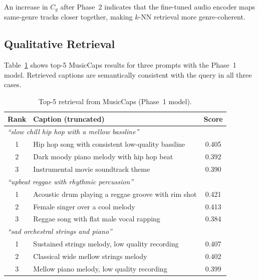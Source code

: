 \documentclass[11pt]{article}
\begin{document}
An increase in $C_g$ after Phase~2 indicates that the fine-tuned audio encoder
maps same-genre tracks closer together, making $k$-NN retrieval more genre-coherent.

\subsection{Qualitative Retrieval}

Table~\ref{tab:qualitative} shows top-5 MusicCaps results for three prompts with
the Phase~1 model. Retrieved captions are semantically consistent with the query
in all three cases.

\begin{table}[h]
\centering
\label{tab:qualitative}
\setlength{\tabcolsep}{4pt}
\begin{tabular}{clc}
\toprule
\textbf{Rank} & \textbf{Caption (truncated)} & \textbf{Score} \\
\midrule
\multicolumn{3}{l}{\textit{``slow chill hip hop with a mellow bassline''}} \\
\midrule
1 & Hip hop song with consistent low-quality bassline   & 0.405 \\
2 & Dark moody piano melody with hip hop beat           & 0.392 \\
3 & Instrumental movie soundtrack theme                 & 0.390 \\
\midrule
\multicolumn{3}{l}{\textit{``upbeat reggae with rhythmic percussion''}} \\
\midrule
1 & Acoustic drum playing a reggae groove with rim shot & 0.421 \\
2 & Female singer over a cool melody                    & 0.413 \\
3 & Reggae song with flat male vocal rapping            & 0.384 \\
\midrule
\multicolumn{3}{l}{\textit{``sad orchestral strings and piano''}} \\
\midrule
1 & Sustained strings melody, low quality recording     & 0.407 \\
2 & Classical wide mellow strings melody                & 0.402 \\
3 & Mellow piano melody, low quality recording          & 0.399 \\
\bottomrule
\end{tabular}
\caption{Top-5 retrieval from MusicCaps (Phase~1 model).}
\end{table}

\end{document}
